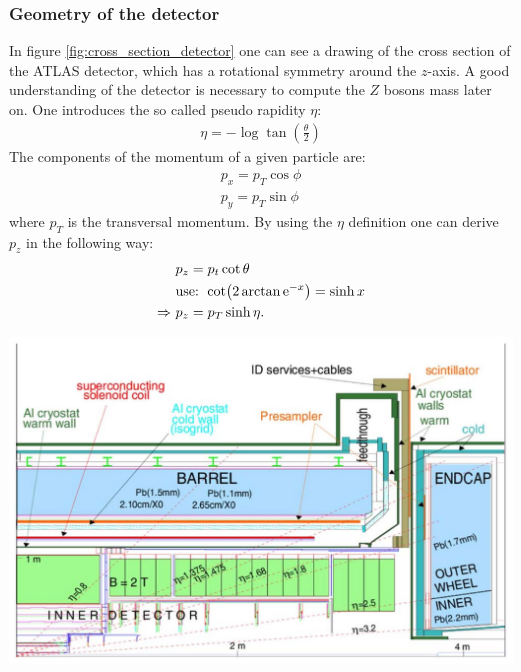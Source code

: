 \documentclass[12pt, a4paper, bibliography=totoc]{scrartcl}
\begin{document}
\begin{multicols}{2}
\subsubsection{Geometry of the detector}
In figure \ref{fig:cross_section_detector} one can see a drawing of the cross section of the ATLAS detector, which has a rotational symmetry around the $z$-axis.
A good understanding of the detector is necessary to compute the $Z$ bosons mass later on. 
One introduces the so called pseudo rapidity $\eta$:
\begin{align}
    \eta = - \log \tan \left( \frac{\theta}{2} \right)
\end{align}
The components of the momentum of a given particle are:
\begin{align}
    p_x = p_T \cos \phi \\
    p_y = p_T \sin \phi
\end{align}
where $p_T$ is the transversal momentum.
By using the $\eta$ definition one can derive $p_z$ in the following way:
\begin{align}
    & p_z = p_t \cot \theta \\
    & \text{use: } \cot (2\arctan \mathrm{e}^{-x}) = \sinh x \\
    \Rightarrow \ & p_z = p_T \sinh \eta .
\end{align}
\begin{center}
\includegraphics[width=0.8\linewidth]{fig/detector_geometry.png}
\label{fig:cross_section_detector}
\end{center}


\end{multicols}
\end{document}
